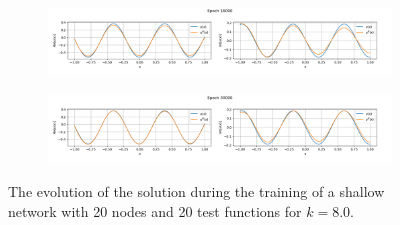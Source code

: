 \begin{figure}[h!]
\begin{subfigure}[b]{0.85\textwidth}
    \end{subfigure}
    \vfill
    \begin{subfigure}[b]{0.85\textwidth}
        \includegraphics[width=\textwidth]{img/evolution_randinit/sol-16000.png}
    \end{subfigure}
    \vfill
    \begin{subfigure}[b]{0.85\textwidth}
        \includegraphics[width=\textwidth]{img/evolution_randinit/sol-30000.png}
    \end{subfigure}
    \caption{The evolution of the solution during the training of a shallow network with 20 nodes and 20 test functions for $k=8.0$.}
    \label{fig:evolutionrandinitsol}
\end{figure}


